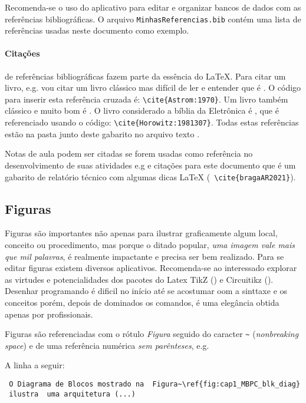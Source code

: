 Recomenda-se o uso do aplicativo \cite{JabRef2021} para editar e organizar bancos de dados com as referências bibliográficas. O arquivo \verb|MinhasReferencias.bib| contém uma lista de referências usadas neste documento como exemplo.

\paragraph{Citações} de referências bibliográficas fazem parte da essência do \LaTeX. Para citar um livro, e.g. vou citar um livro clássico mas difícil de ler e entender que é \cite{Astrom:1970}. O código para inserir esta referência cruzada é: \verb|\cite{Astrom:1970}|.  Um livro também clássico e muito bom é \cite{Astrom:1997}. O livro considerado a bíblia da Eletrônica é \cite{Horowitz:1981307}, que é referenciado usando o código: \verb|\cite{Horowitz:1981307}|. Todas estas referências estão na pasta junto deste gabarito no arquivo texto .

Notas de aula podem ser citadas se forem usadas como referência no desenvolvimento de suas atividades e.g \cite{BragaAR2019} e citações para este documento que é um gabarito de relatório técnico com algumas dicas \LaTeX \cite{bragaAR2021} (\verb| \cite{bragaAR2021}|).

\subsection{Figuras}

Figuras são importantes não apenas para ilustrar  graficamente algum local, conceito ou procedimento, mas porque o ditado popular, \emph{uma imagem vale mais que mil palavras}, é realmente impactante e precisa ser bem realizado. 
Para se editar figuras existem diversos aplicativos. Recomenda-se ao interessado  explorar as virtudes e potencialidades dos pacotes do Latex TikZ (\cite{pgftikz}) e  Circuitikz (\cite{circuitikz}). Desenhar programando é dificil no início até se acostumar oom a sinttaxe e os conceitos porém, depois de dominados os comandos, é uma elegância obtida apenas por profissionais.


Figuras são referenciadas com o rótulo {\textit{Figura}} seguido do caracter \verb|~| (\emph{nonbreaking space}) e de uma referência numérica \textit{sem parênteses}, e.g. 

A linha a seguir:

\begin{verbatim}
 O Diagrama de Blocos mostrado na  Figura~\ref{fig:cap1_MBPC_blk_diag} 
 ilustra  uma arquitetura (...)
\end{verbatim}

